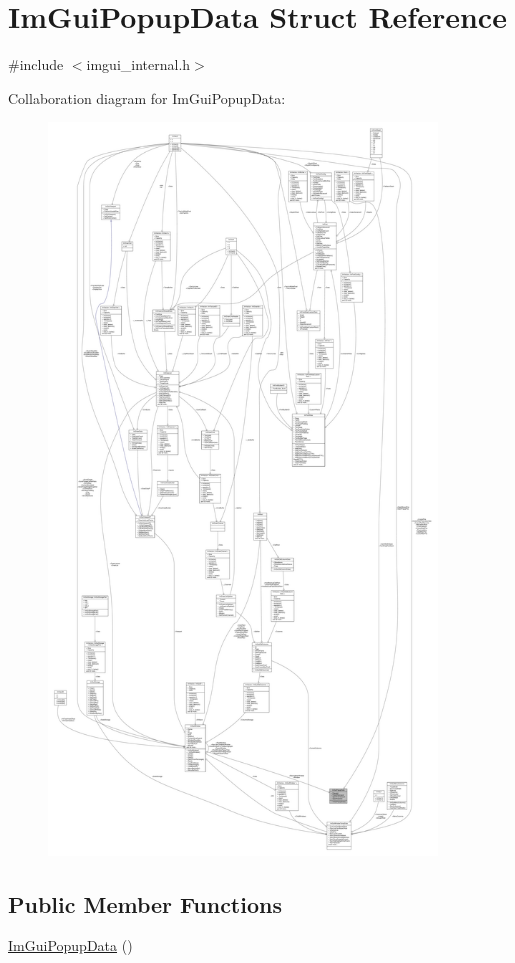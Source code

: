 \hypertarget{structImGuiPopupData}{}\section{Im\+Gui\+Popup\+Data Struct Reference}
\label{structImGuiPopupData}


{\ttfamily \#include $<$imgui\+\_\+internal.\+h$>$}



Collaboration diagram for Im\+Gui\+Popup\+Data\+:
\nopagebreak
\begin{figure}[H]
\begin{center}
\leavevmode
\includegraphics[height=550pt]{structImGuiPopupData__coll__graph}
\end{center}
\end{figure}
\subsection*{Public Member Functions}
\begin{DoxyCompactItemize}
\item 
\hyperlink{structImGuiPopupData_a6db95ae57fd86af23cb2f46451bc3b1b}{Im\+Gui\+Popup\+Data} ()
\end{DoxyCompactItemize}
